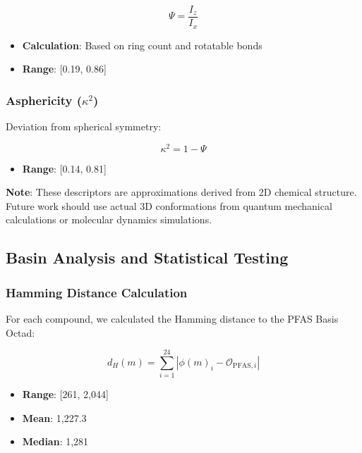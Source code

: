\documentclass[11pt,letterpaper]{article}
\begin{document}
\begin{equation}
\Psi = \frac{I_z}{I_x}
\end{equation}

\begin{itemize}
    \item \textbf{Calculation}: Based on ring count and rotatable bonds
    \item \textbf{Range}: [0.19, 0.86]
\end{itemize}

\subsubsection{Asphericity ($\kappa^2$)}

Deviation from spherical symmetry:

\begin{equation}
\kappa^2 = 1 - \Psi
\end{equation}

\begin{itemize}
    \item \textbf{Range}: [0.14, 0.81]
\end{itemize}

\textbf{Note}: These descriptors are approximations derived from 2D chemical structure. Future work should use actual 3D conformations from quantum mechanical calculations or molecular dynamics simulations.

\subsection{Basin Analysis and Statistical Testing}

\subsubsection{Hamming Distance Calculation}

For each compound, we calculated the Hamming distance to the PFAS Basis Octad:

\begin{equation}
d_H(m) = \sum_{i=1}^{24} |\phi(m)_i - \mathcal{O}_{\text{PFAS},i}|
\end{equation}

\begin{itemize}
    \item \textbf{Range}: [261, 2,044]
    \item \textbf{Mean}: 1,227.3
    \item \textbf{Median}: 1,281
\end{itemize}
\end{document}
